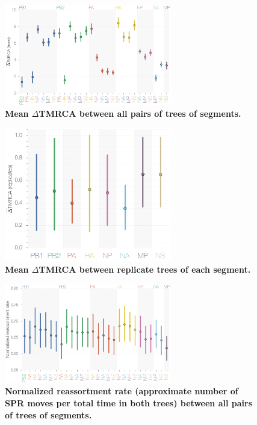 \documentclass[11pt,oneside,letterpaper]{article}
\begin{document}
\begin{figure}
\centering  
\includegraphics[width=0.65\textwidth]  {supp_figures/InfB_supp_deltaTMRCA_trees.png}
\caption{\textbf{Mean $\Delta$TMRCA between all pairs of trees of segments.}}
\label{deltaTMRCAtrees}
\end{figure}

\begin{figure}
\centering  
\includegraphics[width=0.65\textwidth]  {supp_figures/InfB_supp_deltaTMRCA_replicates.png}
\caption{\textbf{Mean $\Delta$TMRCA between replicate trees of each segment.}}
\label{deltaTMRCAreplicates}
\end{figure}

\begin{figure}
\centering  
\includegraphics[width=0.65\textwidth]  {supp_figures/InfB_supp_normRErate.png}
\caption{\textbf{Normalized reassortment rate (approximate number of SPR moves per total time in both trees) between all pairs of trees of segments.}}
\label{}
\end{figure}
\end{document}
